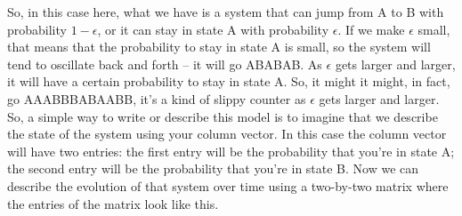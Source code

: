 \documentclass[]{article}
\begin{document}
So, in this case here,
what we have is a system
that can jump from A to B
with probability $1-\epsilon$,
or it can stay in state A
with probability $\epsilon$.
If we make $\epsilon$ small,
that means that the probability
to stay in state A is small,
so the system will tend
to oscillate back and forth –
it will go ABABAB.
As $\epsilon$ gets larger and larger,
it will have a certain probability
to stay in state A.
So, it might it might, in fact,
go AAABBBABAABB,
it’s a kind of slippy counter
as $\epsilon$ gets larger and larger.
So, a simple way
to write or describe this model
is to imagine that we describe
the state of the system
using your column vector.
In this case the column vector
will have two entries:
the first entry will be the probability
that you’re in state A;
the second entry will be the probability
that you’re in state B.
Now we can describe
the evolution of that system over time
using a two-by-two matrix
where the entries of the matrix
look like this.
\end{document}
